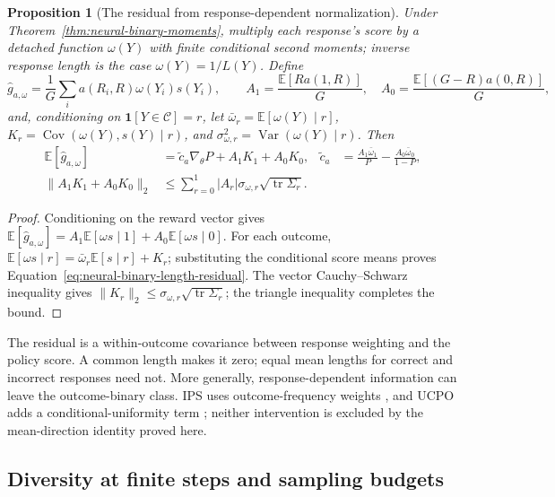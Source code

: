 \documentclass{article}
\newcommand{\enforcehalffinalproseline}{%
  \setlength{\parfillskip}{0pt plus .20\linewidth}}
\newcommand{\1}{\mathbf 1}
\newcommand{\E}{\mathbb E}
\newtheorem{proposition}[lemma]{Proposition}
\theoremstyle{remark}
\theoremstyle{definition}
\theoremstyle{plain}
\begin{document}
\begin{proposition}[The residual from response-dependent normalization]
\enforcehalffinalproseline
\label{prop:neural-binary-length-residual}
Under Theorem~\ref{thm:neural-binary-moments}, multiply each response's score
by a detached function $\omega(Y)$ with finite conditional second moments;
inverse response length is the case $\omega(Y)=1/L(Y)$. Define
\[
 \widehat g_{a,\omega}
 =\frac1G\sum_i a(R_i,R)\omega(Y_i)s(Y_i),\qquad
 A_1=\frac{\E[R a(1,R)]}{G},\quad
 A_0=\frac{\E[(G-R)a(0,R)]}{G},
\]
and, conditioning on $\1[Y\in\mathcal C]=r$, let
$\bar\omega_r=\E[\omega(Y)\mid r]$,
$K_r=\operatorname{Cov}(\omega(Y),s(Y)\mid r)$, and
$\sigma_{\omega,r}^2=\operatorname{Var}(\omega(Y)\mid r)$.
Then
\begin{align}
 \E[\widehat g_{a,\omega}]
 &=\widetilde c_a\nabla_\theta P+A_1K_1+A_0K_0,
 &\widetilde c_a&=\frac{A_1\bar\omega_1}{P}
                  -\frac{A_0\bar\omega_0}{1-P},
 \label{eq:neural-binary-length-residual}\\
 \|A_1K_1+A_0K_0\|_2
 &\le\sum_{r=0}^1|A_r|\sigma_{\omega,r}
                 \sqrt{\operatorname{tr}\Sigma_r}.
 \label{eq:neural-binary-length-bound}
\end{align}
\end{proposition}

\begin{proof}
\enforcehalffinalproseline
Conditioning on the reward vector gives
$\E[\widehat g_{a,\omega}]
=A_1\E[\omega s\mid1]+A_0\E[\omega s\mid0]$.
For each outcome, $\E[\omega s\mid r]
=\bar\omega_r\E[s\mid r]+K_r$; substituting the conditional score
means proves Equation~\eqref{eq:neural-binary-length-residual}.
The vector Cauchy--Schwarz inequality gives
$\|K_r\|_2\le\sigma_{\omega,r}\sqrt{\operatorname{tr}\Sigma_r}$;
the triangle inequality completes the bound.
\end{proof}

The residual is a within-outcome covariance between response weighting and
the policy score. A common length makes it zero; equal mean lengths for
correct and incorrect responses need not. More generally, response-dependent
information can leave the outcome-binary class. IPS uses outcome-frequency
weights \citep[Section~4.4, v1]{sinha2026expected}, and UCPO adds a
conditional-uniformity term \citep[Section~6, v1]{lochab2026ucpo}; neither
intervention is excluded by the mean-direction identity proved here.


\subsection{Diversity at finite steps and sampling budgets}
\label{app:finite-time-diversity}
\end{document}
